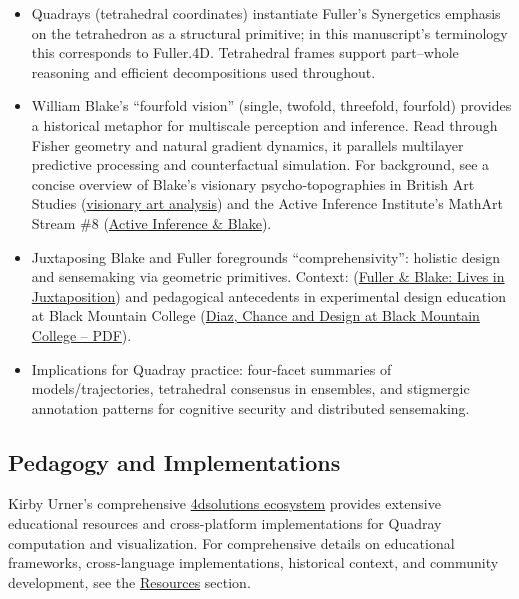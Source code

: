 \documentclass[
  10pt,
]{article}
\providecommand{\tightlist}{%
  \setlength{\itemsep}{0pt}\setlength{\parskip}{0pt}}
\begin{document}
\begin{itemize}
\tightlist
\item
  Quadrays (tetrahedral coordinates) instantiate Fuller's Synergetics
  emphasis on the tetrahedron as a structural primitive; in this
  manuscript's terminology this corresponds to Fuller.4D. Tetrahedral
  frames support part--whole reasoning and efficient decompositions used
  throughout.
\item
  William Blake's ``fourfold vision'' (single, twofold, threefold,
  fourfold) provides a historical metaphor for multiscale perception and
  inference. Read through Fisher geometry and natural gradient dynamics,
  it parallels multilayer predictive processing and counterfactual
  simulation. For background, see a concise overview of Blake's
  visionary psycho‑topographies in British Art Studies
  (\href{https://www.britishartstudies.ac.uk/index/article-index/visionary-sense-of-london/article-category/cover-collaboration}{visionary
  art analysis}) and the Active Inference Institute's MathArt Stream \#8
  (\href{https://zenodo.org/records/13711302}{Active Inference \&
  Blake}).
\item
  Juxtaposing Blake and Fuller foregrounds ``comprehensivity'': holistic
  design and sensemaking via geometric primitives. Context:
  (\href{https://zenodo.org/records/7519132}{Fuller \& Blake: Lives in
  Juxtaposition}) and pedagogical antecedents in experimental design
  education at Black Mountain College
  (\href{https://commons.princeton.edu/eng574-s23/wp-content/uploads/sites/348/2023/03/Diaz-The-Experimenters-Chance-and-Design-at-Black-Mountain-College.pdf}{Diaz,
  Chance and Design at Black Mountain College -- PDF}).
\item
  Implications for Quadray practice: four‑facet summaries of
  models/trajectories, tetrahedral consensus in ensembles, and
  stigmergic annotation patterns for cognitive security and distributed
  sensemaking.
\end{itemize}

\subsection{Pedagogy and
Implementations}\label{pedagogy-and-implementations}

Kirby Urner's comprehensive
\href{https://github.com/4dsolutions}{4dsolutions ecosystem} provides
extensive educational resources and cross-platform implementations for
Quadray computation and visualization. For comprehensive details on
educational frameworks, cross-language implementations, historical
context, and community development, see the
\href{07_resources.md}{Resources} section.
\end{document}
